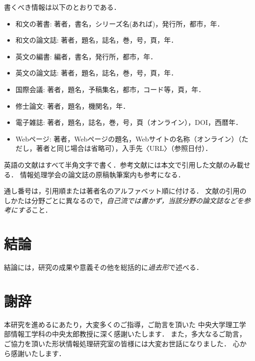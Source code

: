 \documentclass[a4j,12pt]{jreport}
\def\syaji{ \chapter*{謝辞} \addcontentsline{toc}{chapter}{謝辞}}
\begin{document}
書くべき情報は以下のとおりである．
\begin{itemize}
\item 和文の著書: 著者，書名，シリーズ名(あれば)，発行所，都市，年．
\item 和文の論文誌: 著者，題名，誌名，巻，号，頁，年．
\item 英文の編書: 編者，書名，発行所，都市，年．
\item 英文の論文誌: 著者，題名，誌名，巻，号，頁，年．
\item 国際会議: 著者，題名，予稿集名，都市，コード等，頁，年．
\item 修士論文: 著者，題名，機関名，年．
\item 電子雑誌: 著者，題名，誌名，巻，号，頁（オンライン），DOI，西暦年．
\item Webページ: 著者，Webページの題名，Webサイトの名称（オンライン）（ただし，著者と同じ場合は省略可），入手先〈URL〉（参照日付）．
\end{itemize}
英語の文献はすべて半角文字で書く．参考文献には本文で引用した文献のみ載せる．
情報処理学会の論文誌の原稿執筆案内\cite{IPSJ}も参考になる．

通し番号は，引用順または著者名のアルファベット順に付ける．
文献の引用のしかたは分野ごとに異なるので，{\em 自己流では書かず，当該分野の論文誌などを参考にする}こと．



\chapter{結論} \label{chapter:6}

結論には，研究の成果や意義その他を総括的に{\em 過去形}で述べる．



\syaji
\par
本研究を進めるにあたり，大変多くのご指導，ご助言を頂いた
中央大学理工学部情報工学科の中央太郎教授に深く感謝いたします．
また，多大なるご助言，ご協力を頂いた形状情報処理研究室の皆様には大変お世話になりました．
心から感謝いたします．
\end{document}
